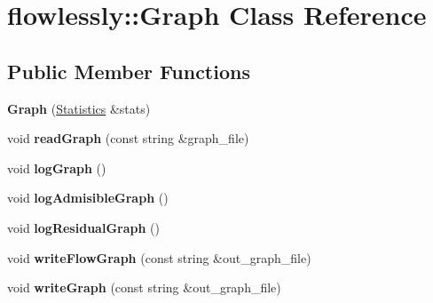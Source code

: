 \hypertarget{classflowlessly_1_1Graph}{\section{flowlessly\-:\-:\-Graph \-Class \-Reference}
\label{classflowlessly_1_1Graph}
}
\subsection*{\-Public \-Member \-Functions}
\begin{DoxyCompactItemize}
\item 
\hypertarget{classflowlessly_1_1Graph_ab8f10dc0cfb341e62b36c8933fd34206}{{\bfseries \-Graph} (\hyperlink{classflowlessly_1_1Statistics}{\-Statistics} \&stats)}\label{classflowlessly_1_1Graph_ab8f10dc0cfb341e62b36c8933fd34206}

\item 
\hypertarget{classflowlessly_1_1Graph_a00102825c05a2f8218c702fa8d215e1f}{void {\bfseries read\-Graph} (const string \&graph\-\_\-file)}\label{classflowlessly_1_1Graph_a00102825c05a2f8218c702fa8d215e1f}

\item 
\hypertarget{classflowlessly_1_1Graph_a7a0f23201c8a6a05dace38b98ce8c02e}{void {\bfseries log\-Graph} ()}\label{classflowlessly_1_1Graph_a7a0f23201c8a6a05dace38b98ce8c02e}

\item 
\hypertarget{classflowlessly_1_1Graph_a4c78cb6fdd88e0ac91b7d3a46ef15fba}{void {\bfseries log\-Admisible\-Graph} ()}\label{classflowlessly_1_1Graph_a4c78cb6fdd88e0ac91b7d3a46ef15fba}

\item 
\hypertarget{classflowlessly_1_1Graph_a887e77fd7799609b877b02f9c42bbd5f}{void {\bfseries log\-Residual\-Graph} ()}\label{classflowlessly_1_1Graph_a887e77fd7799609b877b02f9c42bbd5f}

\item 
\hypertarget{classflowlessly_1_1Graph_a009b8c032eeb3c5cdd9f8985461329f1}{void {\bfseries write\-Flow\-Graph} (const string \&out\-\_\-graph\-\_\-file)}\label{classflowlessly_1_1Graph_a009b8c032eeb3c5cdd9f8985461329f1}

\item 
\hypertarget{classflowlessly_1_1Graph_aff0bd13f59bf394ddd6a8137fc1c92e0}{void {\bfseries write\-Graph} (const string \&out\-\_\-graph\-\_\-file)}\label{classflowlessly_1_1Graph_aff0bd13f59bf394ddd6a8137fc1c92e0}


\end{DoxyCompactItemize}
